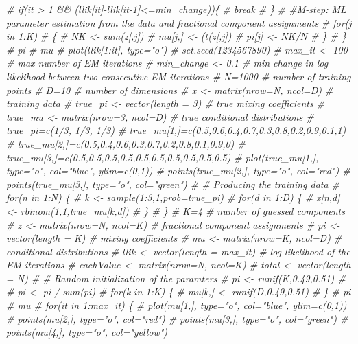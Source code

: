 \documentclass[]{article}
\newenvironment{Shaded}{\begin{snugshade}}{\end{snugshade}}
\newcommand{\CommentTok}[1]{\textcolor[rgb]{0.56,0.35,0.01}{\textit{#1}}}
\begin{document}
\begin{Shaded}
\begin{Highlighting}[]
{\CommentTok{# if(it > 1 && (llik[it]-llik[it-1]<=min_change))\{}
\CommentTok{# break}
\CommentTok{# \}}
\CommentTok{# #M-step: ML parameter estimation from the data and fractional component assignments}
\CommentTok{# for(j in 1:K)}
\CommentTok{# \{}
\CommentTok{# NK <- sum(z[,j])}
\CommentTok{# mu[j,] <- (t(z[,j])%*%x)/sum(z[,j])}
\CommentTok{# pi[j] <- NK/N}
\CommentTok{# \}}
\CommentTok{# \}}
\CommentTok{# pi}
\CommentTok{# mu}
\CommentTok{# plot(llik[1:it], type="o")}
\CommentTok{# set.seed(1234567890)}
\CommentTok{# max_it <- 100 # max number of EM iterations}
\CommentTok{# min_change <- 0.1 # min change in log likelihood between two consecutive EM iterations}
\CommentTok{# N=1000 # number of training points}
\CommentTok{# D=10 # number of dimensions}
\CommentTok{# x <- matrix(nrow=N, ncol=D) # training data}
\CommentTok{# true_pi <- vector(length = 3) # true mixing coefficients}
\CommentTok{# true_mu <- matrix(nrow=3, ncol=D) # true conditional distributions}
\CommentTok{# true_pi=c(1/3, 1/3, 1/3)}
\CommentTok{# true_mu[1,]=c(0.5,0.6,0.4,0.7,0.3,0.8,0.2,0.9,0.1,1)}
\CommentTok{# true_mu[2,]=c(0.5,0.4,0.6,0.3,0.7,0.2,0.8,0.1,0.9,0)}
\CommentTok{# true_mu[3,]=c(0.5,0.5,0.5,0.5,0.5,0.5,0.5,0.5,0.5,0.5)}
\CommentTok{# plot(true_mu[1,], type="o", col="blue", ylim=c(0,1))}
\CommentTok{# points(true_mu[2,], type="o", col="red")}
\CommentTok{# points(true_mu[3,], type="o", col="green")}
\CommentTok{# # Producing the training data}
\CommentTok{# for(n in 1:N) \{}
\CommentTok{# k <- sample(1:3,1,prob=true_pi)}
\CommentTok{# for(d in 1:D) \{}
\CommentTok{# x[n,d] <- rbinom(1,1,true_mu[k,d])}
\CommentTok{# \}}
\CommentTok{# \}}
\CommentTok{# K=4 # number of guessed components}
\CommentTok{# z <- matrix(nrow=N, ncol=K) # fractional component assignments}
\CommentTok{# pi <- vector(length = K) # mixing coefficients}
\CommentTok{# mu <- matrix(nrow=K, ncol=D) # conditional distributions}
\CommentTok{# llik <- vector(length = max_it) # log likelihood of the EM iterations}
\CommentTok{# eachValue <- matrix(nrow=N, ncol=K)}
\CommentTok{# total <- vector(length = N)}
\CommentTok{# # Random initialization of the paramters}
\CommentTok{# pi <- runif(K,0.49,0.51)}
\CommentTok{# }
\CommentTok{# pi <- pi / sum(pi)}
\CommentTok{# for(k in 1:K) \{}
\CommentTok{# mu[k,] <- runif(D,0.49,0.51)}
\CommentTok{# \}}
\CommentTok{# pi}
\CommentTok{# mu}
\CommentTok{# for(it in 1:max_it) \{}
\CommentTok{# plot(mu[1,], type="o", col="blue", ylim=c(0,1))}
\CommentTok{# points(mu[2,], type="o", col="red")}
\CommentTok{# points(mu[3,], type="o", col="green")}
\CommentTok{# points(mu[4,], type="o", col="yellow")}
}}
\end{Highlighting}
\end{Shaded}
\end{document}
